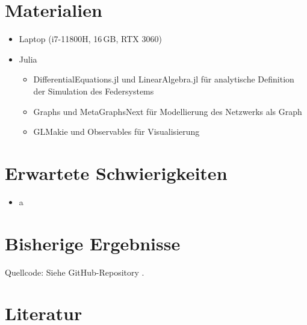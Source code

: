 \documentclass[parskip]{scrartcl}
\begin{document}
\section{Materialien}

\begin{itemize}
    \item Laptop (i7-11800H, 16\,GB, RTX 3060)
    \item Julia
    \begin{itemize}
        \item DifferentialEquations.jl und LinearAlgebra.jl für analytische Definition der Simulation des Federsystems
        \item Graphs und MetaGraphsNext für Modellierung des Netzwerks als Graph
        \item GLMakie und Observables für Visualisierung
    \end{itemize}
\end{itemize}

\section{Erwartete Schwierigkeiten}

\begin{itemize}
    \item a
\end{itemize}

\section{Bisherige Ergebnisse}

Quellcode: Siehe GitHub-Repository \cite{RepoMNN}.


\section{Literatur}

\printbibliography
\end{document}
